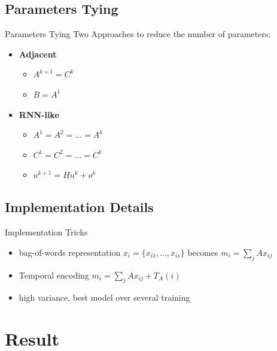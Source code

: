 \documentclass[pdf]{beamer}
\begin{document}
\subsection{Parameters Tying}

\begin{frame}{Parameters Tying}
Two Approaches to reduce the number of parameters:

\begin{itemize}
	\item \textbf{Adjacent}
		\begin{itemize}
			\item $A^{k+1} = C^{k}$
			\item $B = A^1$
		\end{itemize}
	\item \textbf{RNN-like}
		\begin{itemize}
			\item $A^1 = A^2 = ... = A^k$
			\item $C^1 = C^2 = ... = C^k$
			\item $u^{k+1} = Hu^k + o^k$
		\end{itemize}
\end{itemize}

\end{frame}

\subsection{Implementation Details}

\begin{frame}{Implementation Tricks}
\begin{itemize}
	\item bag-of-words representation $x_i = \{x_{i1}, ..., x_{is}\}$ becomes $m_i = \sum_j Ax_{ij}$
	\item Temporal encoding $m_i = \sum_j Ax_{ij} + T_A(i)$
	\item high variance, best model over several training
\end{itemize}	
\end{frame}

\section{Result}
\end{document}
